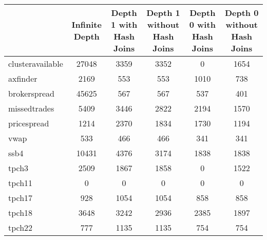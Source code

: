 \begin{tabular}{|l|c|c|c|c|c|}\hline
\ & Infinite Depth & Depth 1 with Hash Joins & Depth 1 without Hash Joins & Depth 0 with Hash Joins & Depth 0 without Hash Joins \\\hline
clusteravailable & 27048 & 3359 & 3352 & 0 & 1654 \\\hline
axfinder & 2169 & 553 & 553 & 1010 & 738 \\\hline
brokerspread & 45625 & 567 & 567 & 537 & 401 \\\hline
missedtrades & 5409 & 3446 & 2822 & 2194 & 1570 \\\hline
pricespread & 1214 & 2370 & 1834 & 1730 & 1194 \\\hline
vwap & 533 & 466 & 466 & 341 & 341 \\\hline
ssb4 & 10431 & 4376 & 3174 & 1838 & 1838 \\\hline
tpch3 & 2509 & 1867 & 1858 & 0 & 1522 \\\hline
tpch11 & 0 & 0 & 0 & 0 & 0 \\\hline
tpch17 & 928 & 1054 & 1054 & 858 & 858 \\\hline
tpch18 & 3648 & 3242 & 2936 & 2385 & 1897 \\\hline
tpch22 & 777 & 1135 & 1135 & 754 & 754 \\\hline
\end{tabular}
